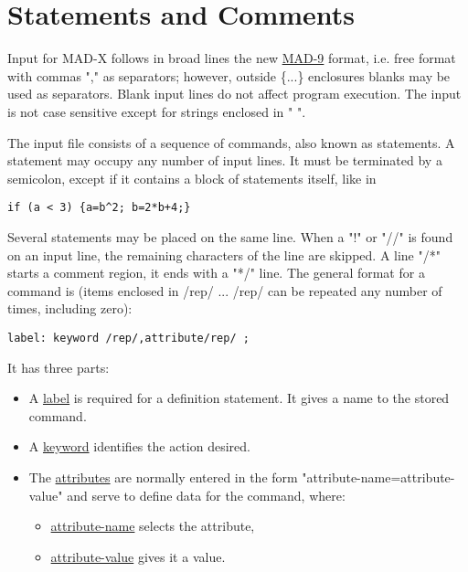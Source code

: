 
\section{Statements and Comments}

Input for MAD-X follows in broad lines the new
\href{http://cern.ch/mad9}{MAD-9} format, i.e. free format with commas
"," as separators; however, outside \{...\} enclosures blanks may be
used as separators. Blank input lines do not affect program
execution. The input is not case sensitive except for strings enclosed
in " ". 

The input file consists of a sequence of commands, also known as
statements. A statement may occupy any number of  input lines. It must
be terminated by a semicolon, except if it contains a block of
statements itself, like in  

\begin{verbatim}
if (a < 3) {a=b^2; b=2*b+4;}
\end{verbatim}

Several statements may be placed on the same line.
When a "!" or "//" is found on an input line,
the remaining characters of the line are skipped.
A line "/*" starts a comment region, it ends with a "*/" line.
The general format for a command is (items enclosed in /rep/ ... /rep/
can be repeated any number of times, including zero):

\begin{verbatim}
label: keyword /rep/,attribute/rep/ ;
\end{verbatim}

It has three parts:
\begin{itemize}
   \item A \href{label.html}{label}
     is required for a definition statement.
     It gives a name to the stored command.
     
   \item A \href{keyword.html}{keyword}
     identifies the action desired.
     
   \item The \href{attribute HREF=attribute.html}{attributes}
     are normally entered in the form
     "attribute-name=attribute-value"
     and serve to define data for the command, where:
     \begin{itemize}
       \item \href{label.html}{attribute-name} selects the attribute,
       \item \href{attribute.html}{attribute-value} gives it a value.       
     \end{itemize}
\end{itemize}

